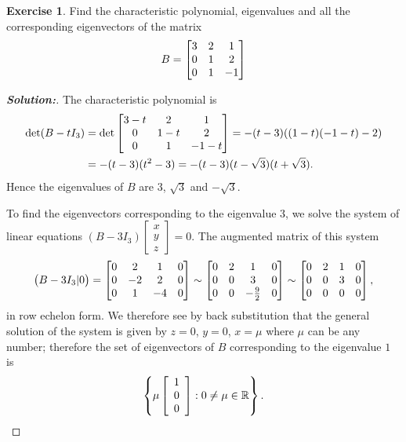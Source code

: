 \documentclass[a4paper]{amsart}
\theoremstyle{definition}
\newtheorem{exercise}{Exercise}
\newenvironment{solution}{\begin{proof}[\textbf{Solution:}] \vphantom{u}}{\end{proof}}
\begin{document}
\begin{exercise}\label{ex-evectors-ii}
 Find the characteristic polynomial, eigenvalues and all the corresponding
 eigenvectors of the matrix
 \[ B = \left[\begin{matrix} 3 & 2 & 1 \\ 0 & 1 & 2 \\ 0 & 1 & -1 \end{matrix}\right] \]
\end{exercise}
\begin{solution}
 The characteristic polynomial is
    \begin{align*} \det (B - tI_3) & =
    \det \left[\begin{matrix}
    3-t & 2 & 1 \\
 0 & 1-t & 2 \\
 0 & 1 & -1-t
    \end{matrix}\right]=-(t-3)((1-t)(-1-t) - 2)\\ & = -(t-3)(t^2-3)
    = -(t-3)(t - \sqrt{3})(t+\sqrt{3}).
    \end{align*}
 Hence the eigenvalues of $B$ are $3$, $\sqrt{3}$ and $-\sqrt{3}$.

 To find the eigenvectors corresponding to the eigenvalue $3$, we
 solve the system of linear equations $(B - 3I_3)\left[
 \begin{array}{c}x \\ y\\z
 \end{array} \right] = 0$. The augmented matrix of this system
 $$
 \big(B - 3I_3|0\big) = \left[\begin{matrix} 0& 2&
 1&0\\0&-2&2&0\\0&1&-4&0\end{matrix}\right] \sim \left[\begin{matrix} 0& 2&
 1&0\\0&0&3&0\\0&0&-\frac{9}{2}&0\end{matrix}\right] \sim \left[\begin{matrix}
 0& 2& 1&0\\0&0&3&0\\0&0&0&0\end{matrix}\right],
 $$
 in row echelon form. We therefore see by back substitution that
 the general solution of the system is given by $z = 0$, $y = 0$,
 $x = \mu$ where $\mu$ can be any number; therefore the set of
 eigenvectors of $B$ corresponding to the eigenvalue $1$ is
 $$
 \left\{ \mu \left[ \begin{array}{c} 1\\0\\0
 \end{array} \right] : 0 \neq \mu \in {\mathbb{R}} \right\}.
 $$


\end{solution}
\end{document}
